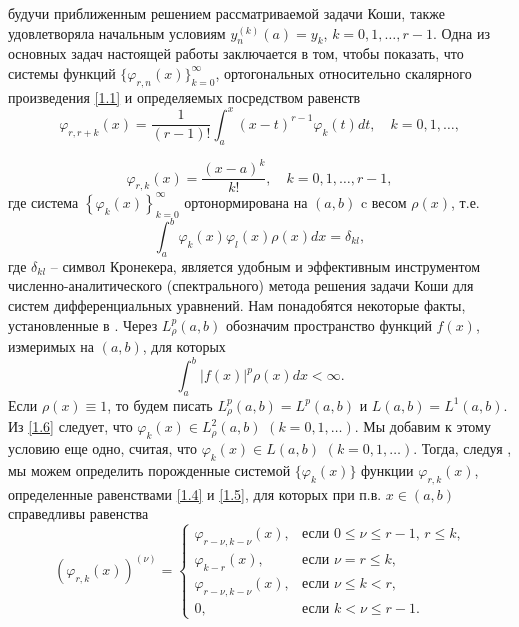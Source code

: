  будучи приближенным решением рассматриваемой задачи Коши, также удовлетворяла начальным условиям $y_n^{(k)}(a)=y_k$, $k=0,1,\ldots,r-1$. Одна из основных задач настоящей работы заключается в том, чтобы показать, что системы функций
 $ \{\varphi_{r,n}(x)\}_{k=0}^\infty$, ортогональных относительно скалярного произведения \eqref{1.1} и определяемых посредством равенств
  \begin{equation}\label{1.4}
\varphi_{r,r+k}(x) =\frac{1}{(r-1)!}\int_a^x(x-t)^{r-1}\varphi_{k}(t)dt, \quad k=0,1,\ldots,
\end{equation}

  \begin{equation}\label{1.5}
\varphi_{r,k}(x) =\frac{(x-a)^k}{k!}, \quad k=0,1,\ldots, r-1,
\end{equation}
где система $\left\{\varphi_k(x)\right\}_{k=0}^\infty$ ортонормирована  на $(a,b)$  c весом   $\rho(x)$, т.е.
 \begin{equation}\label{1.6}
\int_a^b\varphi_k(x)\varphi_l(x)\rho(x)dx=\delta_{kl},
\end{equation}
где $\delta_{kl}$ -- символ Кронекера, является удобным и эффективным инструментом  численно-аналитического (спектрального) метода решения задачи Коши для систем дифференциальных уравнений.   Нам понадобятся некоторые факты, установленные в \cite{Shar20}.
  Через $L^p_\rho(a,b)$ обозначим пространство  функций $f(x)$, измеримых  на  $(a,b)$, для которых
 \begin{equation*}
\int_a^b|f(x)|^p\rho(x)dx<\infty.
\end{equation*}
Если $\rho(x)\equiv1$, то будем писать $L^p_\rho(a,b)=L^p(a,b)$ и $L(a,b)=L^1(a,b)$.
Из \eqref{1.6} следует, что $\varphi_k(x)\in L^2_\rho(a,b)$ $(k=0,1,\ldots)$. Мы добавим к этому условию еще одно, считая, что $\varphi_k(x)\in L(a,b)$ $(k=0,1,\ldots)$. Тогда, следуя  \cite{Shar20}, мы можем определить  порожденные системой $\{\varphi_k(x)\}$ функции $\varphi_{r,k}(x)$, определенные равенствами \eqref{1.4} и \eqref{1.5}, для которых при п.в. $x\in (a,b)$ справедливы равенства
 \begin{equation}\label{1.7}
(\varphi_{r,k}(x))^{(\nu)} =\begin{cases}\varphi_{r-\nu,k-\nu}(x),&\text{если $0\le\nu\le r-1$, $r\le k$,}\\
\varphi_{k-r}(x),&\text{если  $\nu=r\le k$,}\\
\varphi_{r-\nu,k-\nu}(x),&\text{если $\nu\le k< r$,}\\
0,&\text{если $k< \nu\le r-1$}.
  \end{cases}
\end{equation}
